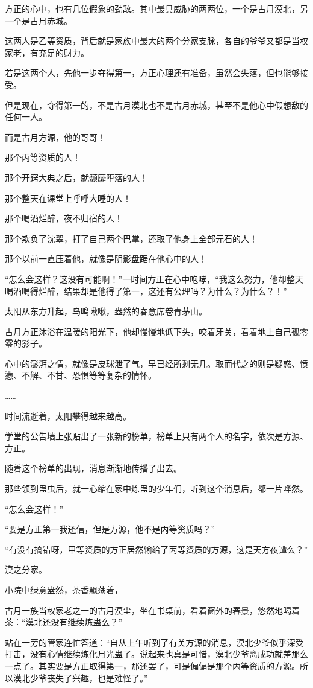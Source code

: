\begin{this_body}
方正的心中，也有几位假象的劲敌。其中最具威胁的两两位，一个是古月漠北，另一个是古月赤城。

这两人是乙等资质，背后就是家族中最大的两个分家支脉，各自的爷爷又都是当权家老，有充足的财力。

若是这两个人，先他一步夺得第一，方正心理还有准备，虽然会失落，但也能够接受。

但是现在，夺得第一的，不是古月漠北也不是古月赤城，甚至不是他心中假想敌的任何一人。

而是古月方源，他的哥哥！

那个丙等资质的人！

那个开窍大典之后，就颓靡堕落的人！

那个整天在课堂上呼呼大睡的人！

那个喝酒烂醉，夜不归宿的人！

那个欺负了沈翠，打了自己两个巴掌，还取了他身上全部元石的人！

那个以前一直压着他，就像是阴影盘踞在他心中的人！

“怎么会这样？这没有可能啊！”一时间方正在心中咆哮，“我这么努力，他却整天喝酒喝得烂醉，结果却是他得了第一，这还有公理吗？为什么？为什么？！”

太阳从东方升起，鸟鸣啾啾，盎然的春意席卷青茅山。

古月方正沐浴在温暖的阳光下，他却慢慢地低下头，咬着牙关，看着地上自己孤零零的影子。

心中的澎湃之情，就像是皮球泄了气，早已经所剩无几。取而代之的则是疑惑、愤懑、不解、不甘、恐惧等等复杂的情怀。

……

时间流逝着，太阳攀得越来越高。

学堂的公告墙上张贴出了一张新的榜单，榜单上只有两个人的名字，依次是方源、方正。

随着这个榜单的出现，消息渐渐地传播了出去。

那些领到蛊虫后，就一心缩在家中炼蛊的少年们，听到这个消息后，都一片哗然。

“怎么会这样！”

“要是方正第一我还信，但是方源，他不是丙等资质吗？”

“有没有搞错呀，甲等资质的方正居然输给了丙等资质的方源，这是天方夜谭么？”

漠之分家。

小院中绿意盎然，茶香飘荡着，

古月一族当权家老之一的古月漠尘，坐在书桌前，看着窗外的春景，悠然地喝着茶：“漠北还没有继续炼蛊么？”

站在一旁的管家连忙答道：“自从上午听到了有关方源的消息，漠北少爷似乎深受打击，没有心情继续炼化月光蛊了。说起来也真是可惜，漠北少爷离成功就差那么一点了。其实要是方正取得第一，那还罢了，可是偏偏是那个丙等资质的方源。所以漠北少爷丧失了兴趣，也是难怪了。”


\end{this_body}
